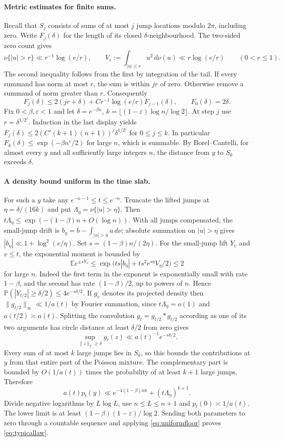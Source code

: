 \documentclass[11pt,letterpaper]{article}
\theoremstyle{plain}
\theoremstyle{definition}\newtheorem{example}[theorem]{Example}
\begin{document}
\paragraph{Metric estimates for finite sums.}
Recall that $S_j$ consists of sums of at most $j$ jump locations modulo
$2\pi$, including zero. Write $F_j(\delta)$ for the length of its
closed $\delta$-neighbourhood. The two-sided zero count gives
\[
 \nu\{|u|>r\}\ll r^{-1}\log(e/r),\qquad
 V_r:=\int_{|u|\le r}u^2\,d\nu(u)\ll r\log(e/r)
 \qquad(0<r\le1).
\]
The second inequality follows from the first by integration of the
tail. If every summand has norm at most $r$, the sum is within $jr$
of zero. Otherwise remove a summand of norm greater than $r$.
Consequently
\[
 F_j(\delta)\le 2(jr+\delta)
       +C r^{-1}\log(e/r)F_{j-1}(\delta),\qquad F_0(\delta)=2\delta.
\]
Fix $0<\beta,\varepsilon<1$ and let
$\delta=e^{-\beta n}$, $k=\lfloor(1-\varepsilon)\log n/\log 2\rfloor$.
At step $j$ use $r=\delta^{1/2^j}$. Induction in the last display yields
$F_j(\delta)\le 2(C'(k+1)(n+1))^j\delta^{1/2^j}$ for $0\le j\le k$.
In particular $F_k(\delta)\le\exp(-\beta n^\varepsilon/2)$ for large
$n$, which is summable. By Borel--Cantelli, for almost every $y$ and
all sufficiently large integers $n$, the distance from $y$ to $S_k$
exceeds $\delta$.

\paragraph{A density bound uniform in the time slab.}
For such a $y$ take any $e^{-n-1}\le t\le e^{-n}$.
Truncate the lifted jumps at $\eta=\delta/(16k)$ and put
$\Lambda_\eta=\nu\{|u|>\eta\}$. Then
$t\Lambda_\eta\le\exp(-(1-\beta)n+O(\log n))$.
With all jumps compensated, the small-jump drift is
$b_\eta=b-\int_{|u|>\eta}u\,d\nu$; absolute summation on
$|u|>\eta$ gives $|b_\eta|\ll1+\log^2(e/\eta)$.
Set $s=(1-\beta)n/(2\eta)$. For the small-jump lift $Y_v$ and
$v\le t$, the exponential moment is bounded by
\[
 \mathbb E e^{\pm sY_v}
 \le \exp\bigl(t s|b_\eta|+t s^2 e^{s\eta}V_\eta/2\bigr)\le 2
\]
for large $n$. Indeed the first term in the exponent is exponentially
small with rate $1-\beta$, and the second has rate $(1-\beta)/2$, up
to powers of $n$. Hence
$\mathbb P(|Y_{t/2}|\ge\delta/2)\le4e^{-s\delta/2}$.
If $g_v$ denotes its projected density then
$\|g_{t/2}\|_\infty\ll 1/a(t)$ by Fourier summation, since
$t\Lambda_\eta=o(1)$ and $a(t/2)\asymp a(t)$.
Splitting the convolution $g_t=g_{t/2}*g_{t/2}$ according as one
of its two arguments has circle distance at least $\delta/2$ from
zero gives
\[
 \sup_{\|z\|_{\mathbb T}\ge\delta}g_t(z)
 \ll a(t)^{-1} e^{-s\delta/2}.
\]
Every sum of at most $k$ large jumps lies in $S_k$, so this bounds
the contributions at $y$ from that entire part of the Poisson mixture.
The complementary part is bounded by $O(1/a(t))$ times the probability
of at least $k+1$ large jumps. Therefore
\[
 a(t)p_t(y)\ll e^{-4(1-\beta)nk}
   +(t\Lambda_\eta)^{k+1}.
\]
Divide negative logarithms by $L\log L$, use $n\le L\le n+1$ and
$p_t(0)\asymp 1/a(t)$. The lower limit is at least
$(1-\beta)(1-\varepsilon)/\log 2$. Sending both parameters to zero
through a countable sequence and applying \eqref{eq:uniformfloor}
proves \eqref{eq:typicallaw}.
\end{document}
